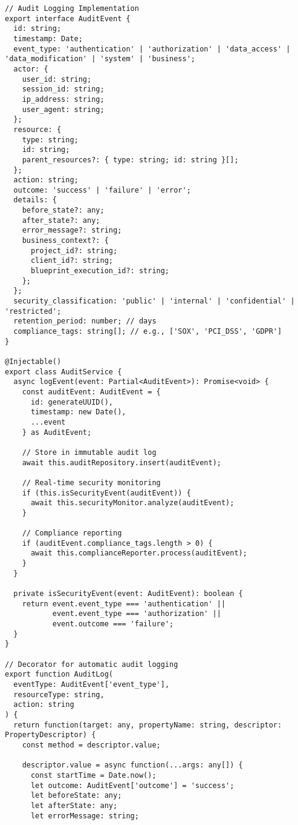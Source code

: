 \begin{verbatim}
// Audit Logging Implementation
export interface AuditEvent {
  id: string;
  timestamp: Date;
  event_type: 'authentication' | 'authorization' | 'data_access' | 'data_modification' | 'system' | 'business';
  actor: {
    user_id: string;
    session_id: string;
    ip_address: string;
    user_agent: string;
  };
  resource: {
    type: string;
    id: string;
    parent_resources?: { type: string; id: string }[];
  };
  action: string;
  outcome: 'success' | 'failure' | 'error';
  details: {
    before_state?: any;
    after_state?: any;
    error_message?: string;
    business_context?: {
      project_id?: string;
      client_id?: string;
      blueprint_execution_id?: string;
    };
  };
  security_classification: 'public' | 'internal' | 'confidential' | 'restricted';
  retention_period: number; // days
  compliance_tags: string[]; // e.g., ['SOX', 'PCI_DSS', 'GDPR']
}

@Injectable()
export class AuditService {
  async logEvent(event: Partial<AuditEvent>): Promise<void> {
    const auditEvent: AuditEvent = {
      id: generateUUID(),
      timestamp: new Date(),
      ...event
    } as AuditEvent;
    
    // Store in immutable audit log
    await this.auditRepository.insert(auditEvent);
    
    // Real-time security monitoring
    if (this.isSecurityEvent(auditEvent)) {
      await this.securityMonitor.analyze(auditEvent);
    }
    
    // Compliance reporting
    if (auditEvent.compliance_tags.length > 0) {
      await this.complianceReporter.process(auditEvent);
    }
  }
  
  private isSecurityEvent(event: AuditEvent): boolean {
    return event.event_type === 'authentication' ||
           event.event_type === 'authorization' ||
           event.outcome === 'failure';
  }
}

// Decorator for automatic audit logging
export function AuditLog(
  eventType: AuditEvent['event_type'],
  resourceType: string,
  action: string
) {
  return function(target: any, propertyName: string, descriptor: PropertyDescriptor) {
    const method = descriptor.value;
    
    descriptor.value = async function(...args: any[]) {
      const startTime = Date.now();
      let outcome: AuditEvent['outcome'] = 'success';
      let beforeState: any;
      let afterState: any;
      let errorMessage: string;
      

\end{verbatim}
